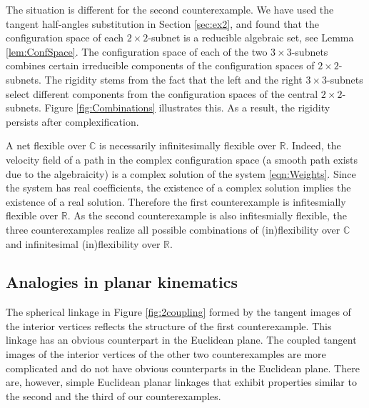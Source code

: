 \documentclass{amsart}
\theoremstyle{definition}
\newcommand\RR{\mathbb{R}}
\newcommand\CC{\mathbb{C}}
\begin{document}
The situation is different for the second counterexample.
We have used the tangent half-angles substitution in Section \ref{sec:ex2}, and found that the configuration space of each $2 \times 2$-subnet is a reducible algebraic set, see Lemma \ref{lem:ConfSpace}.
The configuration space of each of the two $3 \times 3$-subnets combines certain irreducible components of the configuration spaces of $2 \times 2$-subnets.
The rigidity stems from the fact that the left and the right $3 \times 3$-subnets select different components from the configuration spaces of the central $2 \times 2$-subnets.
Figure \ref{fig:Combinations} illustrates this.
As a result, the rigidity persists after complexification.

A net flexible over $\CC$ is necessarily infinitesimally flexible over $\RR$.
Indeed, the velocity field of a path in the complex configuration space (a smooth path exists due to the algebraicity) is a complex solution of the system \eqref{eqn:Weights}.
Since the system has real coefficients, the existence of a complex solution implies the existence of a real solution.
Therefore the first counterexample is infitesmially flexible over $\RR$.
As the second counterexample is also infitesmially flexible, the three counterexamples realize all possible combinations of (in)flexibility over $\CC$ and infinitesimal (in)flexibility over $\RR$.


\subsection{Analogies in planar kinematics}
The spherical linkage in Figure \ref{fig:2coupling} formed by the tangent images of the interior vertices reflects the structure of the first counterexample.
This linkage has an obvious counterpart in the Euclidean plane.
The coupled tangent images of the interior vertices of the other two counterexamples are more complicated and do not have obvious counterparts in the Euclidean plane.
There are, however, simple Euclidean planar linkages that exhibit properties similar to the second and the third of our counterexamples.
\end{document}
